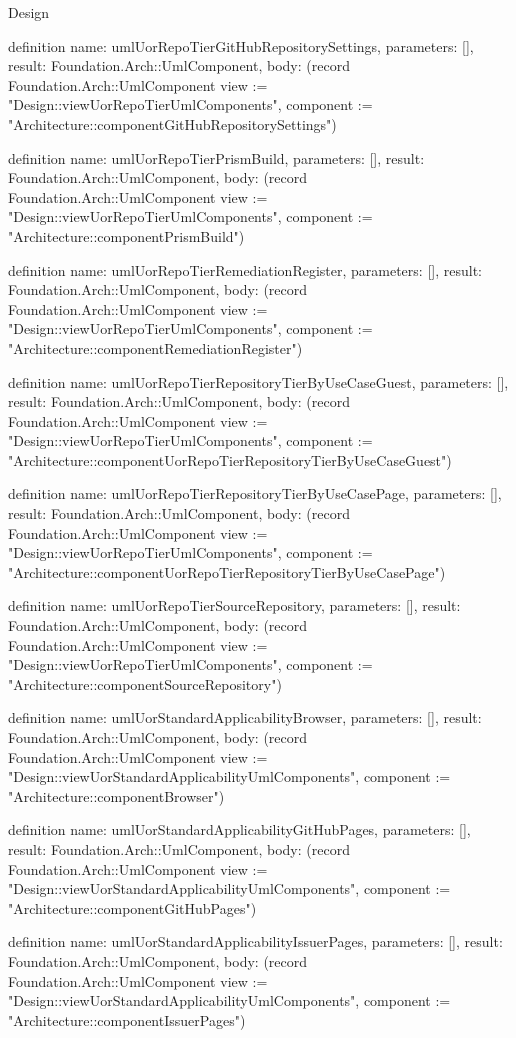 \begin{lexlean}{Design}
\begin{semanticmodule}
definition{
  name: umlUorRepoTierGitHubRepositorySettings,
  parameters: [],
  result: Foundation.Arch::UmlComponent,
  body: (record Foundation.Arch::UmlComponent {view := "Design::viewUorRepoTierUmlComponents", component := "Architecture::componentGitHubRepositorySettings"})
}

definition{
  name: umlUorRepoTierPrismBuild,
  parameters: [],
  result: Foundation.Arch::UmlComponent,
  body: (record Foundation.Arch::UmlComponent {view := "Design::viewUorRepoTierUmlComponents", component := "Architecture::componentPrismBuild"})
}

definition{
  name: umlUorRepoTierRemediationRegister,
  parameters: [],
  result: Foundation.Arch::UmlComponent,
  body: (record Foundation.Arch::UmlComponent {view := "Design::viewUorRepoTierUmlComponents", component := "Architecture::componentRemediationRegister"})
}

definition{
  name: umlUorRepoTierRepositoryTierByUseCaseGuest,
  parameters: [],
  result: Foundation.Arch::UmlComponent,
  body: (record Foundation.Arch::UmlComponent {view := "Design::viewUorRepoTierUmlComponents", component := "Architecture::componentUorRepoTierRepositoryTierByUseCaseGuest"})
}

definition{
  name: umlUorRepoTierRepositoryTierByUseCasePage,
  parameters: [],
  result: Foundation.Arch::UmlComponent,
  body: (record Foundation.Arch::UmlComponent {view := "Design::viewUorRepoTierUmlComponents", component := "Architecture::componentUorRepoTierRepositoryTierByUseCasePage"})
}

definition{
  name: umlUorRepoTierSourceRepository,
  parameters: [],
  result: Foundation.Arch::UmlComponent,
  body: (record Foundation.Arch::UmlComponent {view := "Design::viewUorRepoTierUmlComponents", component := "Architecture::componentSourceRepository"})
}

definition{
  name: umlUorStandardApplicabilityBrowser,
  parameters: [],
  result: Foundation.Arch::UmlComponent,
  body: (record Foundation.Arch::UmlComponent {view := "Design::viewUorStandardApplicabilityUmlComponents", component := "Architecture::componentBrowser"})
}

definition{
  name: umlUorStandardApplicabilityGitHubPages,
  parameters: [],
  result: Foundation.Arch::UmlComponent,
  body: (record Foundation.Arch::UmlComponent {view := "Design::viewUorStandardApplicabilityUmlComponents", component := "Architecture::componentGitHubPages"})
}

definition{
  name: umlUorStandardApplicabilityIssuerPages,
  parameters: [],
  result: Foundation.Arch::UmlComponent,
  body: (record Foundation.Arch::UmlComponent {view := "Design::viewUorStandardApplicabilityUmlComponents", component := "Architecture::componentIssuerPages"})
}


\end{semanticmodule}
\end{lexlean}
